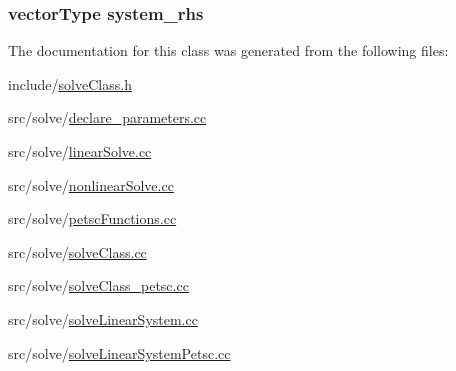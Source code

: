 \subsubsection[{system\-\_\-rhs}]{\setlength{\rightskip}{0pt plus 5cm}vector\-Type system\-\_\-rhs}\label{classsolve_class_a6c39fa839fdc40d2408946617a778571}


The documentation for this class was generated from the following files\-:\begin{DoxyCompactItemize}
\item 
include/\hyperlink{solve_class_8h}{solve\-Class.\-h}\item 
src/solve/\hyperlink{solve_2declare__parameters_8cc}{declare\-\_\-parameters.\-cc}\item 
src/solve/\hyperlink{linear_solve_8cc}{linear\-Solve.\-cc}\item 
src/solve/\hyperlink{nonlinear_solve_8cc}{nonlinear\-Solve.\-cc}\item 
src/solve/\hyperlink{petsc_functions_8cc}{petsc\-Functions.\-cc}\item 
src/solve/\hyperlink{solve_class_8cc}{solve\-Class.\-cc}\item 
src/solve/\hyperlink{solve_class__petsc_8cc}{solve\-Class\-\_\-petsc.\-cc}\item 
src/solve/\hyperlink{solve_linear_system_8cc}{solve\-Linear\-System.\-cc}\item 
src/solve/\hyperlink{solve_linear_system_petsc_8cc}{solve\-Linear\-System\-Petsc.\-cc}\end{DoxyCompactItemize}
